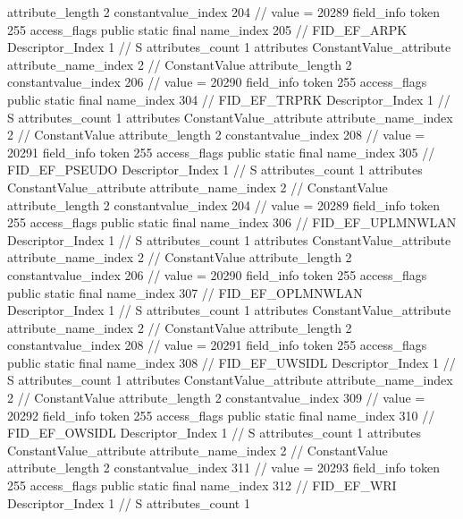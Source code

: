{{{{{{{					attribute_length	2
					constantvalue_index	204		// value = 20289
				}
				}
			}
			field_info {
				token	255
				access_flags	public static final
				name_index	205		// FID_EF_ARPK
				Descriptor_Index	1		// S
				attributes_count	1
				attributes {
				ConstantValue_attribute {
					attribute_name_index	2		// ConstantValue
					attribute_length	2
					constantvalue_index	206		// value = 20290
				}
				}
			}
			field_info {
				token	255
				access_flags	public static final
				name_index	304		// FID_EF_TRPRK
				Descriptor_Index	1		// S
				attributes_count	1
				attributes {
				ConstantValue_attribute {
					attribute_name_index	2		// ConstantValue
					attribute_length	2
					constantvalue_index	208		// value = 20291
				}
				}
			}
			field_info {
				token	255
				access_flags	public static final
				name_index	305		// FID_EF_PSEUDO
				Descriptor_Index	1		// S
				attributes_count	1
				attributes {
				ConstantValue_attribute {
					attribute_name_index	2		// ConstantValue
					attribute_length	2
					constantvalue_index	204		// value = 20289
				}
				}
			}
			field_info {
				token	255
				access_flags	public static final
				name_index	306		// FID_EF_UPLMNWLAN
				Descriptor_Index	1		// S
				attributes_count	1
				attributes {
				ConstantValue_attribute {
					attribute_name_index	2		// ConstantValue
					attribute_length	2
					constantvalue_index	206		// value = 20290
				}
				}
			}
			field_info {
				token	255
				access_flags	public static final
				name_index	307		// FID_EF_OPLMNWLAN
				Descriptor_Index	1		// S
				attributes_count	1
				attributes {
				ConstantValue_attribute {
					attribute_name_index	2		// ConstantValue
					attribute_length	2
					constantvalue_index	208		// value = 20291
				}
				}
			}
			field_info {
				token	255
				access_flags	public static final
				name_index	308		// FID_EF_UWSIDL
				Descriptor_Index	1		// S
				attributes_count	1
				attributes {
				ConstantValue_attribute {
					attribute_name_index	2		// ConstantValue
					attribute_length	2
					constantvalue_index	309		// value = 20292
				}
				}
			}
			field_info {
				token	255
				access_flags	public static final
				name_index	310		// FID_EF_OWSIDL
				Descriptor_Index	1		// S
				attributes_count	1
				attributes {
				ConstantValue_attribute {
					attribute_name_index	2		// ConstantValue
					attribute_length	2
					constantvalue_index	311		// value = 20293
				}
				}
			}
			field_info {
				token	255
				access_flags	public static final
				name_index	312		// FID_EF_WRI
				Descriptor_Index	1		// S
				attributes_count	1
}}}}}
